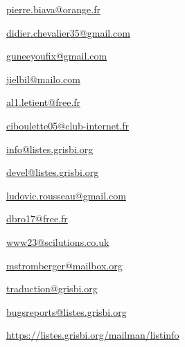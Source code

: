 
\urldef{\urlPierreBiavaEmail}%
\url{pierre.biava@orange.fr}     %

\urldef{\urlDidierChevalierEmail}%
\url{didier.chevalier35@gmail.com}     %

\urldef{\urlWilliamOllivierEmail}%
\url{guneeyoufix@gmail.com}     %


\urldef{\urlJeanLucDuflotEmail}%
\url{jielbil@mailo.com}     %

\urldef{\urlAlainLetientEmail}%
\url{al1.letient@free.fr}     %


\urldef{\urlMicheleBondilEmail}%
\url{ciboulette05@club-internet.fr}     %

\urldef{\urlListInfoEmail}%
\url{info@listes.grisbi.org}     %

\urldef{\urlListDevelEmail}%
\url{devel@listes.grisbi.org}     %

\urldef{\urlLudovicRousseauEmail}%
\url{ludovic.rousseau@gmail.com}     %

\urldef{\urlDominiqueBrochardEmail}%
\url{dbro17@free.fr}     %

\urldef{\urlBobAndersonEmail}%
\url{www23@scilutions.co.uk}     %

\urldef{\urlMartinStrombergerEmail}%
\url{mstromberger@mailbox.org}     %

\urldef{\urlListTraductionEmail}%
\url{traduction@grisbi.org}  %

\urldef{\urlListBugsreport}%
\url{bugsreports@listes.grisbi.org}     %

\urldef{\urlListDiffGrisbi}%
\url{https://listes.grisbi.org/mailman/listinfo}     %

%
